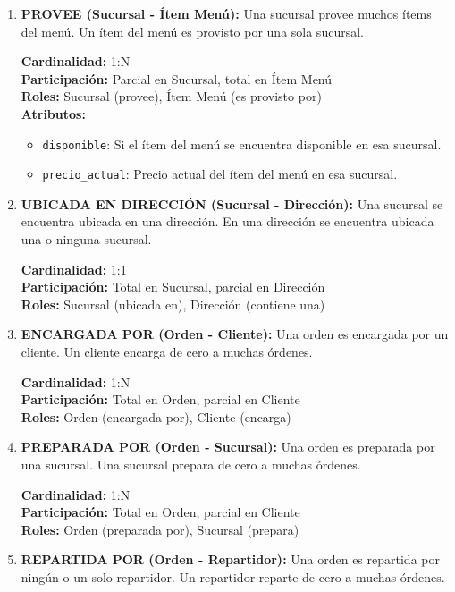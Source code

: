 \begin{enumerate}
    \item \textbf{PROVEE (Sucursal - Ítem Menú):} Una sucursal provee muchos ítems del menú. Un ítem del menú es provisto por una sola sucursal.

    \textbf{Cardinalidad:} 1:N \\
    \textbf{Participación:} Parcial en Sucursal, total en Ítem Menú \\
    \textbf{Roles:} Sucursal (provee), Ítem Menú (es provisto por) \\
    \textbf{Atributos:}
    \begin{itemize}
        \item \texttt{disponible}: Si el ítem del menú se encuentra disponible en esa sucursal.
        \item \texttt{precio\_actual}: Precio actual del ítem del menú en esa sucursal.
    \end{itemize}

    \item \textbf{UBICADA EN DIRECCIÓN (Sucursal - Dirección):} Una sucursal se encuentra ubicada en una dirección. En una dirección se encuentra ubicada una o ninguna sucursal.

    \textbf{Cardinalidad:} 1:1 \\
    \textbf{Participación:} Total en Sucursal, parcial en Dirección \\
    \textbf{Roles:} Sucursal (ubicada en), Dirección (contiene una)

    \item \textbf{ENCARGADA POR (Orden - Cliente):} Una orden es encargada por un cliente. Un cliente encarga de cero a muchas órdenes.

    \textbf{Cardinalidad:} 1:N \\
    \textbf{Participación:} Total en Orden, parcial en Cliente \\
    \textbf{Roles:} Orden (encargada por), Cliente (encarga)

    \item \textbf{PREPARADA POR (Orden - Sucursal):} Una orden es preparada por una sucursal. Una sucursal prepara de cero a muchas órdenes.

    \textbf{Cardinalidad:} 1:N \\
    \textbf{Participación:} Total en Orden, parcial en Cliente \\
    \textbf{Roles:} Orden (preparada por), Sucursal (prepara)

    \item \textbf{REPARTIDA POR (Orden - Repartidor):} Una orden es repartida por ningún o un solo repartidor. Un repartidor reparte de cero a muchas órdenes.


\end{enumerate}
